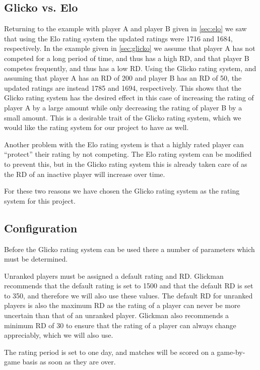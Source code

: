 \subsection{Glicko vs. Elo}
Returning to the example with player A and player B given in \autoref{sec:elo} we saw that using the Elo rating system the updated ratings were 1716 and 1684, respectively.
In the example given in \autoref{sec:glicko} we assume that player A has not competed for a long period of time, and thus has a high RD, and that player B competes frequently, and thus has a low RD.
Using the Glicko rating system, and assuming that player A has an RD of 200 and player B has an RD of 50, the updated ratings are instead 1785 and 1694, respectively.
This shows that the Glicko rating system has the desired effect in this case of increasing the rating of player A by a large amount while only decreasing the rating of player B by a small amount.
This is a desirable trait of the Glicko rating system, which we would like the rating system for our project to have as well.

Another problem with the Elo rating system is that a highly rated player can ``protect'' their rating by not competing.
The Elo rating system can be modified to prevent this, but in the Glicko rating system this is already taken care of as the RD of an inactive player will increase over time.

For these two reasons we have chosen the Glicko rating system as the rating system for this project. 

\subsection{Configuration}
\label{sec:glicko_config}
Before the Glicko rating system can be used there a number of parameters which must be determined.

Unranked players must be assigned a default rating and RD.
Glickman recommends that the default rating is set to 1500 and that the default RD is set to 350, and therefore we will also use these values.
The default RD for unranked players is also the maximum RD as the rating of a player can never be more uncertain than that of an unranked player.
Glickman also recommends a minimum RD of 30 to ensure that the rating of a player can always change appreciably, which we will also use.

The rating period is set to one day, and matches will be scored on a game-by-game basis as soon as they are over.

